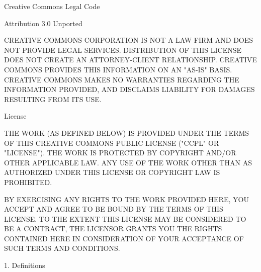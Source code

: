 Creative Commons Legal Code

Attribution 3.0 Unported

    CREATIVE COMMONS CORPORATION IS NOT A LAW FIRM AND DOES NOT PROVIDE
    LEGAL SERVICES. DISTRIBUTION OF THIS LICENSE DOES NOT CREATE AN
    ATTORNEY-CLIENT RELATIONSHIP. CREATIVE COMMONS PROVIDES THIS
    INFORMATION ON AN "AS-IS" BASIS. CREATIVE COMMONS MAKES NO WARRANTIES
    REGARDING THE INFORMATION PROVIDED, AND DISCLAIMS LIABILITY FOR
    DAMAGES RESULTING FROM ITS USE.

License

THE WORK (AS DEFINED BELOW) IS PROVIDED UNDER THE TERMS OF THIS CREATIVE
COMMONS PUBLIC LICENSE ("CCPL" OR "LICENSE"). THE WORK IS PROTECTED BY
COPYRIGHT AND/OR OTHER APPLICABLE LAW. ANY USE OF THE WORK OTHER THAN AS
AUTHORIZED UNDER THIS LICENSE OR COPYRIGHT LAW IS PROHIBITED.

BY EXERCISING ANY RIGHTS TO THE WORK PROVIDED HERE, YOU ACCEPT AND AGREE
TO BE BOUND BY THE TERMS OF THIS LICENSE. TO THE EXTENT THIS LICENSE MAY
BE CONSIDERED TO BE A CONTRACT, THE LICENSOR GRANTS YOU THE RIGHTS
CONTAINED HERE IN CONSIDERATION OF YOUR ACCEPTANCE OF SUCH TERMS AND
CONDITIONS.

1. Definitions

